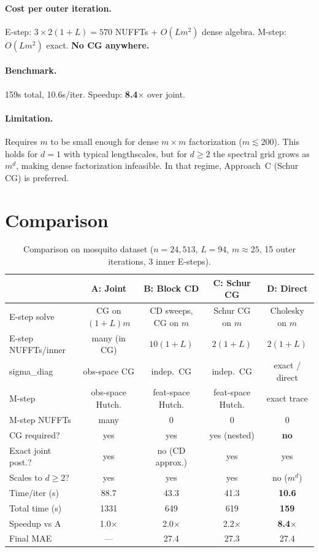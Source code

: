 \documentclass[11pt]{article}
\begin{document}
\paragraph{Cost per outer iteration.}
E-step: $3 \times 2(1{+}L) = 570$ NUFFTs + $O(Lm^2)$ dense algebra.
M-step: $O(Lm^2)$ exact. \textbf{No CG anywhere.}

\paragraph{Benchmark.} 159s total, 10.6s/iter.
Speedup: \textbf{8.4$\times$} over joint.

\paragraph{Limitation.} Requires $m$ to be small enough for dense
$m{\times}m$ factorization ($m \lesssim 200$). This holds for $d{=}1$
with typical lengthscales, but for $d \geq 2$ the spectral grid
grows as $m^d$, making dense factorization infeasible. In that regime,
Approach~C (Schur CG) is preferred.

\section{Comparison}

\begin{table}[h]
\centering
\begin{tabular}{@{}lcccc@{}}
\toprule
& \textbf{A: Joint} & \textbf{B: Block CD} & \textbf{C: Schur CG} & \textbf{D: Direct} \\
\midrule
E-step solve & CG on $(1{+}L)m$ & CD sweeps, CG on $m$ & Schur CG on $m$ & Cholesky on $m$ \\
E-step NUFFTs/inner & many (in CG) & $10(1{+}L)$ & $2(1{+}L)$ & $2(1{+}L)$ \\
sigma\_diag & obs-space CG & indep.\ CG & indep.\ CG & exact / direct \\
M-step & obs-space Hutch. & feat-space Hutch. & feat-space Hutch. & exact trace \\
M-step NUFFTs & many & 0 & 0 & 0 \\
CG required? & yes & yes & yes (nested) & \textbf{no} \\
Exact joint post.? & yes & no (CD approx.) & yes & yes \\
Scales to $d{\geq}2$? & yes & yes & yes & no ($m^d$) \\
\midrule
Time/iter (s) & 88.7 & 43.3 & 41.3 & \textbf{10.6} \\
Total time (s) & 1331 & 649 & 619 & \textbf{159} \\
Speedup vs A & 1.0$\times$ & 2.0$\times$ & 2.2$\times$ & \textbf{8.4$\times$} \\
Final MAE & --- & 27.4 & 27.3 & 27.4 \\
\bottomrule
\end{tabular}
\caption{Comparison on mosquito dataset ($n{=}24{,}513$, $L{=}94$, $m{\approx}25$,
  15 outer iterations, 3 inner E-steps).}
\end{table}
\end{document}
